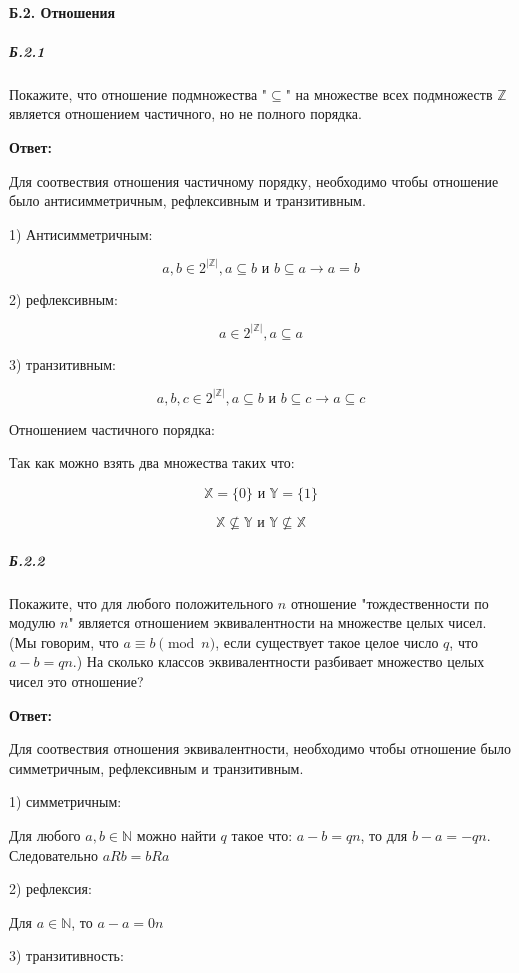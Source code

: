 \paragraph{Б.2. Отношения}
\subparagraph{Б.2.1}
Покажите, что отношение подмножества "$\subseteq$" на множестве всех 
подмножеств $\mathbb{Z}$ является отношением частичного, но не полного порядка.

\textbf{Ответ:}

Для соотвествия отношения частичному порядку, необходимо чтобы отношение 
было антисимметричным, рефлексивным и транзитивным.

1) Антисимметричным:

\[
a,b \in  2^{\left| \mathbb{Z} \right|}, a \subseteq b \text{ и } b \subseteq a \rightarrow  a = b
\]

2) рефлексивным:

\[
a \in 2^{\left| \mathbb{Z} \right|}, a \subseteq a
\]

3) транзитивным:

\[
a,b,c \in 2^{\left| \mathbb{Z} \right|}, a \subseteq b \text{ и } b \subseteq c \rightarrow  a \subseteq c
\]

Отношением частичного порядка:

Так как можно взять два множества таких что:

\[
\mathbb{X} = \{0\} \text{ и } \mathbb{Y} = \{1\} 
\]

\[
\mathbb{X} \not \subseteq \mathbb{Y} \text{ и } \mathbb{Y} \not \subseteq \mathbb{X}
\]

\subparagraph{Б.2.2}

Покажите, что для любого положительного \( n \) отношение 
"тождественности по модулю $ n $" является отношением 
эквивалентности на множестве целых чисел.  
(Мы говорим, что $ a \equiv b \pmod{n} $, 
если существует такое целое число $ q $, что $ a - b = qn $.) 
На сколько классов эквивалентности разбивает множество целых чисел это отношение?

\textbf{Ответ:}

Для соотвествия отношения эквивалентности, необходимо чтобы отношение 
было симметричным, рефлексивным и транзитивным.

1) симметричным:

Для любого $a, b \in \mathbb{N} $ можно найти $q$ такое что: $a-b=qn$,
то для $b-a=-qn$. Следовательно $aRb = bRa $

2) рефлексия:

Для $a \in \mathbb{N} $, то $a-a=0n$

3) транзитивность:

